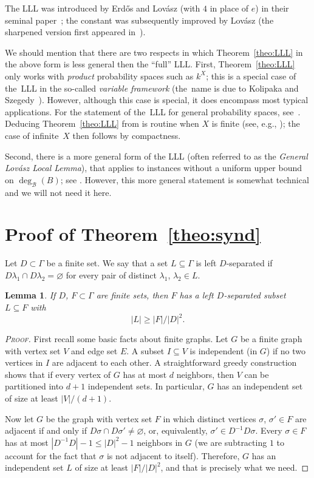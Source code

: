 \documentclass[11pt, reqno, psamsfonts]{amsart}
\theoremstyle{bfnote}
\newtheorem{lemma}[equation]{Lemma}
\theoremstyle{claim}
\theoremstyle{definition}
\theoremstyle{remark}
\newcommand{\0}{\varnothing}
\renewcommand{\leq}{\leqslant}
\renewcommand{\geq}{\geqslant}
\renewcommand{\G}{\Gamma}
\newcommand{\emphd}[1]{{\fontseries{b}\selectfont\textsf{#1}}}
\newcommand{\B}{{\mathscr{B}}}
\newcommand{\bemph}[1]{{\normalfont#1}} %
\newcommand{\ep}[1]{\bemph{(}#1\bemph{)}} %
\newenvironment{scproof}[1][Proof]{\begin{proof}[\textsc{#1}]}{\end{proof}}
\numberwithin{equation}{section}
\begin{document}
	The LLL was introduced by Erd\H os and Lov\'asz \ep{with $4$ in place of $e$} in their seminal paper~\cite{EL}; the constant was subsequently improved by Lov\'asz (the sharpened version first appeared in~\cite{Spencer}).
	
	We should mention that there are two respects in which Theorem~\ref{theo:LLL} in the above form is less general then the ``full'' LLL. First, Theorem~\ref{theo:LLL} only works with \emph{product} probability spaces such as $k^X$; this is a special case of the~LLL in the so-called \emph{variable framework} (the~name is due to Kolipaka and Szegedy~\cite{KolipakaSzegedy}).
	However, although this case is special, it does encompass most typical applications. For the statement of the~LLL for general probability spaces, see~\cite[Corollary~5.1.2]{AS}. Deducing Theorem~\ref{theo:LLL} from \cite[Corollary~5.1.2]{AS} is routine when $X$ is finite (see, e.g., \cite[41]{MR}); the case of infinite~$X$ then follows by compactness.
	
	Second, there is a more general form of the LLL \ep{often referred to as the \emph{General Lov\'asz Local Lemma}}, that applies to instances without a uniform upper bound on $\deg_\B(B)$; see \cite[Theorem 5.1.1]{AS}. However, this more general statement is somewhat technical and we will not need it here.
	
	\section{Proof of Theorem~\ref{theo:synd}}\label{sec:synd}
	
	Let $D \subset \G$ be a finite set. We say that a set $L \subseteq \G$ is \emphd{left $D$-separated} if $D\lambda_1 \cap D\lambda_2 = \0$ for every pair of distinct $\lambda_1$, $\lambda_2 \in L$.
	
	\begin{lemma}\label{lemma:indep}
		If $D$, $F \subset \G$ are finite sets, then $F$ has a left $D$-separated subset $L \subseteq F$ with \[|L| \geq |F|/|D|^2.\]
	\end{lemma}
	\begin{scproof}
		First recall some basic facts about finite graphs. Let $G$ be a finite graph with vertex set $V$ and edge set $E$. A subset $I \subseteq V$ is \emphd{independent \ep{in $G$}} if no two vertices in $I$ are adjacent to each other. A straightforward greedy construction shows that if every vertex of $G$ has at most $d$ neighbors, then $V$ can be partitioned into $d+1$ independent sets. In particular, $G$ has an independent set of size at least $|V|/(d+1)$.
		
		Now let $G$ be the graph with vertex set $F$ in which distinct vertices $\sigma$, $\sigma' \in F$ are adjacent if and only if $D\sigma \cap D\sigma' \neq \0$, or, equivalently, $\sigma' \in D^{-1}D\sigma$. Every $\sigma \in F$ has at most $|D^{-1}D| - 1 \leq |D|^2 - 1$ neighbors in $G$ \ep{we are subtracting $1$ to account for the fact that $\sigma$ is not adjacent to itself}. Therefore, $G$ has an independent set $L$ of size at least $|F|/|D|^2$, and that is precisely what we need.
	\end{scproof}
\end{document}
